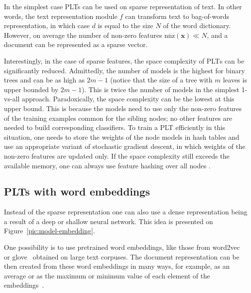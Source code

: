 \documentclass{article}
\newcommand{\Algo}[1]{\textsc{#1}}
\renewcommand{\vec}[1]{\boldsymbol{#1}}
\newcommand{\bx}{\vec{x}}
\newcommand{\sectionBefore}{-0pt}
\newcommand{\sectionAfter}{-0pt}
\begin{document}
In the simplest case PLTs can be used on sparse representation of text. In other words, the text representation module $f$ can transform text to bag-of-words representation, in which case $d$ is equal to the size $N$ of the word dictionary. However, on average the number of non-zero features $\overline{\mathrm{nnz}}(\bx) \ll N$, and a document can be represented as a sparse vector. 

Interestingly, in the case of sparse features, the space complexity of \Algo{PLT}s can be significantly reduced. Admittedly, the number of models is the highest for binary trees and can be as high as $2m-1$ (notice that the size of a tree with $m$ leaves is upper bounded by $2m-1$). This is twice the number of models in the simplest 1-vs-all approach. Paradoxically, the space complexity can be the lowest at this upper bound. This is because the models need to use only the non-zero features of the training examples common for the sibling nodes; no other features are needed to build corresponding classifiers. To train a \Algo{PLT} efficiently in this situation, one needs to store the weights of the node models in hash tables and use an appropriate variant of stochastic gradient descent, in which weights of the non-zero features are updated only. If the space complexity still exceeds the available memory, one can always use feature hashing over all nodes \cite{Weinberger_et_al_2009}.


\vspace{\sectionBefore}
\subsection{PLTs with word embeddings}
\label{sec:word_embeddings}
\vspace{\sectionAfter}

Instead of the sparse representation one can also use a dense representation being a result of a deep or shallow neural network. This idea is presented on Figure~\ref{pic:model-embedding}.

One possibility is to use pretrained word embeddings, like those from word2vec~\citep{Mikolov_et_al_2013} or glove~\citep{Pennigton_et_al_2014} obtained on large text corpuses. The document representation can be then created from these word embeddings in many ways, for example, as an average or as the maximum or minimum value of each element of the embeddings~\citep{De_Boom_et_al_2016}.
\end{document}
